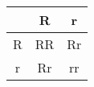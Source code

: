 \documentclass{article}
\begin{document}
\begin{table}[h!]
  \begin{center}
    \caption{}\label{tab:table1}
    \begin{tabular}{|c|c|c|}\hline
      & R & r \\\hline
    R & RR & Rr \\\hline
    r & Rr & rr \\\hline
    \end{tabular}
  \end{center}
\end{table}
\end{document}
